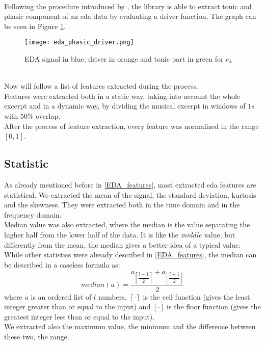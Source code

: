 \\
Following the procedure introduced by \cite{bizzego2019pyphysio}, the library is able to extract tonic and phasic component of an \gls{eda} data by evaluating a driver function. The graph can be seen in Figure \ref{fig:eda_phasic_driver}.
\begin{figure}[h]
    \centering
    \texttt{[image: eda\_phasic\_driver.png]} 
	\caption{EDA signal in blue, driver in orange and tonic part in green for $e_4$}
    \label{fig:eda_phasic_driver}
\end{figure}
\\
Now will follow a list of features extracted during the process.
\\
Features were extracted both in a static way, taking into account the whole excerpt and in a dynamic way, by dividing the musical excerpt in windows of $1s$ with $50\%$ overlap.
\\
After the process of feature extraction, every feature was normalized in the range $[0,1]$.

\subsection{Statistic}
As already mentioned before in \ref{EDA_features}, most extracted \gls{eda} features are statistical. We extracted the mean of the signal, the standard deviation, kurtosis and the skewness. They were extracted both in the time domain and in the frequency domain.
\\ \indent
Median value was also extracted, where the median is the value separating the higher half from the lower half of the data. It is like the \textit{middle} value, but differently from the mean, the median gives a better idea of a typical value.
\\
While other statistics were already described in \ref{EDA_features}, the median can be described in a caseless formula as:
\begin{equation}
	median(a)=\dfrac{a_{\left \lceil{\dfrac{l+1}{2}}\right \rceil}+a_{\left \lfloor{\dfrac{l+1}{2}}\right \rfloor}}{2}
\end{equation}
where $a$ is an ordered list of $l$ numbers, $\left \lceil {\cdot} \right \rceil$ is the ceil function (gives the least integer greater than or equal to the input) and $\left \lfloor {\cdot} \right \rfloor$ is the floor function (gives the greatest integer less than or equal to the input).
\\ \indent
We extracted also the maximum value, the minimum and the difference between these two, the range.

